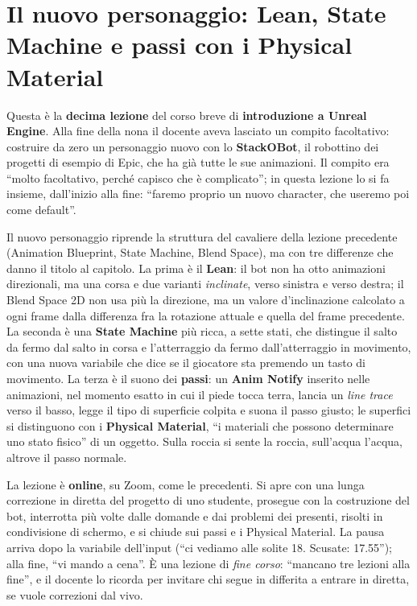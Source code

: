 \chapter[Lean, State Machine e Physical Material]{Il nuovo personaggio: Lean,
State Machine e passi con i Physical Material}
\label{ue10:cap:bot}

Questa è la \textbf{decima lezione} del corso breve di \textbf{introduzione a Unreal
Engine}. Alla fine della nona il docente aveva lasciato un compito facoltativo: costruire
da zero un personaggio nuovo con lo \textbf{StackOBot}, il robottino dei progetti di
esempio di Epic, che ha già tutte le sue animazioni. Il compito era ``molto facoltativo,
perché capisco che è complicato''; in questa lezione lo si fa insieme, dall'inizio alla
fine: ``faremo proprio un nuovo character, che useremo poi come default''.

Il nuovo personaggio riprende la struttura del cavaliere della lezione precedente
(Animation Blueprint, State Machine, Blend Space), ma con tre differenze che danno il
titolo al capitolo. La prima è il \textbf{Lean}: il bot non ha otto animazioni
direzionali, ma una corsa e due varianti \emph{inclinate}, verso sinistra e verso
destra; il Blend Space 2D non usa più la direzione, ma un valore d'inclinazione calcolato
a ogni frame dalla differenza fra la rotazione attuale e quella del frame precedente. La
seconda è una \textbf{State Machine} più ricca, a sette stati, che distingue il salto da
fermo dal salto in corsa e l'atterraggio da fermo dall'atterraggio in movimento, con una
nuova variabile che dice se il giocatore sta premendo un tasto di movimento. La terza è
il suono dei \textbf{passi}: un \textbf{Anim Notify} inserito nelle animazioni, nel
momento esatto in cui il piede tocca terra, lancia un \emph{line trace} verso il basso,
legge il tipo di superficie colpita e suona il passo giusto; le superfici si distinguono
con i \textbf{Physical Material}, ``i materiali che possono determinare uno stato fisico''
di un oggetto. Sulla roccia si sente la roccia, sull'acqua l'acqua, altrove il passo
normale.

La lezione è \textbf{online}, su Zoom, come le precedenti. Si apre con una lunga
correzione in diretta del progetto di uno studente, prosegue con la costruzione del bot,
interrotta più volte dalle domande e dai problemi dei presenti, risolti in condivisione di
schermo, e si chiude sui passi e i Physical Material. La pausa arriva dopo la variabile
dell'input (``ci vediamo alle solite 18. Scusate: 17.55''); alla fine, ``vi mando a
cena''. È una lezione di \emph{fine corso}: ``mancano tre lezioni alla fine'', e il
docente lo ricorda per invitare chi segue in differita a entrare in diretta, se vuole
correzioni dal vivo.

